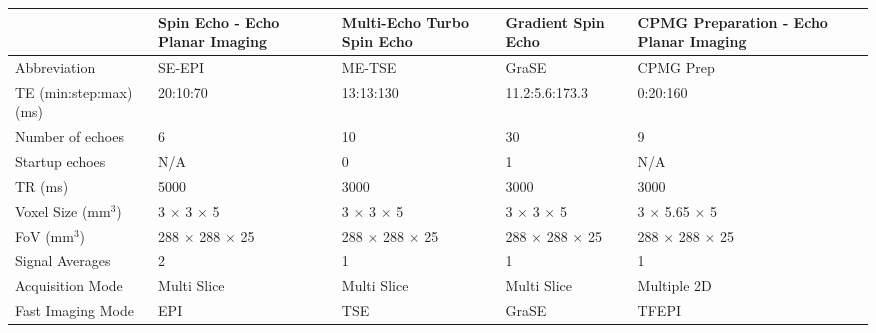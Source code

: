 \begin{table}[H]
	\centering
	\begin{adjustbox}{width=1.0\textwidth, center}
	\begin{tabularx}{1.25\textwidth}{X|X|X|X|X}
		                                                     & Spin Echo - Echo Planar Imaging & Multi-Echo Turbo Spin Echo & Gradient Spin Echo & CPMG \ttwo Preparation - Echo Planar Imaging \\ \hline
		Abbreviation                                         & SE-EPI                          & ME-TSE                     & GraSE              & CPMG \ttwo Prep     \\ \hline
		TE (min:step:max) (ms)                               & 20:10:70                        & 13:13:130                  & 11.2:5.6:173.3     & 0:20:160            \\ \hline
		Number of   echoes                                   & 6                               & 10                         & 30                 & 9                   \\ \hline
		Startup echoes                                       & N/A                             & 0                          & 1                  & N/A                 \\ \hline
		TR (ms)                                              & 5000                            & 3000                       & 3000               & 3000                \\ \hline
		Voxel Size   (mm$^3$)                                & 3 $\times$ 3 $\times$ 5         & 3 $\times$ 3 $\times$ 5    &3 $\times$ 3 $\times$ 5 &3 $\times$ 5.65 $\times$ 5\\ \hline
		FoV (mm$^3$)                                         & 288 $\times$ 288 $\times$ 25    & 288 $\times$ 288 $\times$ 25&288 $\times$ 288 $\times$ 25&288 $\times$ 288 $\times$ 25\\ \hline
		Signal   Averages                                    & 2                               & 1                          & 1                  & 1                   \\ \hline
		Acquisition Mode                                     & Multi Slice                     & Multi Slice                & Multi Slice        & Multiple 2D         \\ \hline
		Fast   Imaging Mode                                  & EPI                             & TSE                        & GraSE              & TFEPI               \\ \hline

\end{tabularx}
\end{adjustbox}
\end{table}
